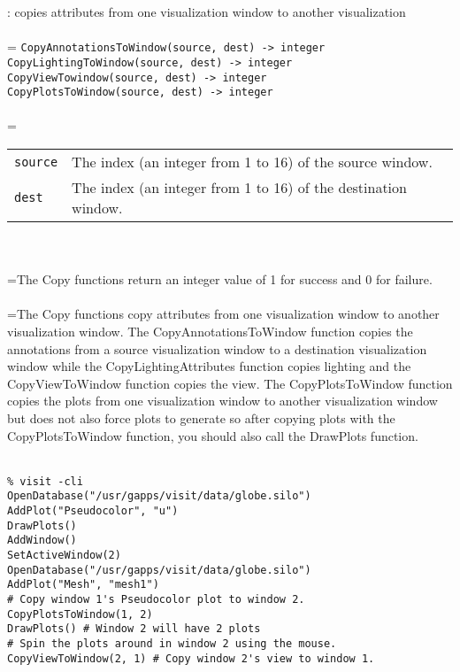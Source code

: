 \documentclass[10pt,a4paper]{report}
\begin{document}
{}
: copies attributes from one visualization window to another visualization\\[-3mm]

 \\ 
\hangindent=\parindent 
\verb!CopyAnnotationsToWindow(source, dest) -> integer!\\ 
\verb!CopyLightingToWindow(source, dest) -> integer!\\ 
\verb!CopyViewTowindow(source, dest) -> integer!\\ 
\verb!CopyPlotsToWindow(source, dest) -> integer!\\ [-3mm]

 \\ 
\hangindent=\parindent 
\begin{tabular}{lp{9cm}}
\verb!source! & The index (an integer from 1 to 16) of the source window. \\
\verb!dest! & The index (an integer from 1 to 16) of the destination window. \\
\end{tabular} \\[-2mm]


 \\ 
\hangindent=\parindent The Copy functions return an integer value of 1 for success and 0 for failure. \\[-3mm] 

 \\ 
\hangindent=\parindent The Copy functions copy attributes from one visualization window to another visualization window. The CopyAnnotationsToWindow function copies the annotations from a source visualization window to a destination visualization window while the CopyLightingAttributes function copies lighting and the CopyViewToWindow function copies the view. The CopyPlotsToWindow function copies the plots from one visualization window to another visualization window but does not also force plots to generate so after copying plots with the CopyPlotsToWindow function, you should also call the DrawPlots function. \\[-3mm] 

\\[-6mm]
\begin{verbatim}% visit -cli
OpenDatabase("/usr/gapps/visit/data/globe.silo")
AddPlot("Pseudocolor", "u")
DrawPlots()
AddWindow()
SetActiveWindow(2)
OpenDatabase("/usr/gapps/visit/data/globe.silo")
AddPlot("Mesh", "mesh1")
# Copy window 1's Pseudocolor plot to window 2.
CopyPlotsToWindow(1, 2) 
DrawPlots() # Window 2 will have 2 plots
# Spin the plots around in window 2 using the mouse.
CopyViewToWindow(2, 1) # Copy window 2's view to window 1.
\end{verbatim}
\newpage
\end{document}
